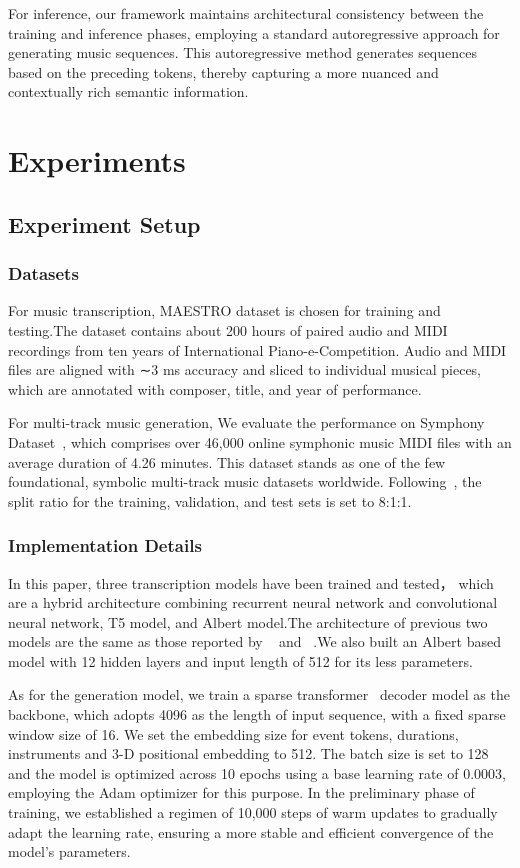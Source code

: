 \documentclass{article}
\begin{document}
For inference, our framework maintains architectural consistency between the training and inference phases, employing a standard autoregressive approach for generating music sequences. This autoregressive method generates sequences based on the preceding tokens, thereby capturing a more nuanced and contextually rich semantic information.

\section{Experiments}

\subsection{Experiment Setup} 
\subsubsection{Datasets}
For music transcription, MAESTRO dataset is chosen for training and testing.The dataset contains about 200 hours of paired audio and MIDI recordings from ten years of International Piano-e-Competition. Audio and MIDI files are aligned with ∼3 ms accuracy and sliced to individual musical pieces, which are annotated with composer, title, and year of performance. 

For multi-track music generation, We evaluate the performance on Symphony Dataset~\citep{liu2022symphony}, which comprises over 46,000 online symphonic music MIDI files with an average duration of 4.26 minutes. This dataset stands as one of the few foundational, symbolic multi-track music datasets worldwide. Following~\citep{liu2022symphony}, the split ratio for the training, validation, and test sets is set to 8:1:1.

\subsubsection{Implementation Details} In this paper, three transcription models have been trained and tested， which are a hybrid architecture combining recurrent neural network and convolutional neural network, T5 model, and Albert model.The architecture of previous two models are the same as those reported by ~\citep{9413601} and ~\citep{gardner2021mt3}.We also built an Albert based model with 12 hidden layers and input length of 512 for its less parameters.

As for the generation model, we train a sparse transformer~\citep{sparse} decoder model as the backbone, which adopts 4096 as the length of input sequence, with a fixed sparse window size of 16. We set the embedding size for event tokens, durations, instruments and 3-D positional embedding to 512.
The batch size is set to 128 and the model is optimized across 10 epochs using a base learning rate of 0.0003, employing the Adam optimizer for this purpose.
In the preliminary phase of training, we established a regimen of 10,000 steps of warm updates to gradually adapt the learning rate, ensuring a more stable and efficient convergence of the model's parameters.
\end{document}
